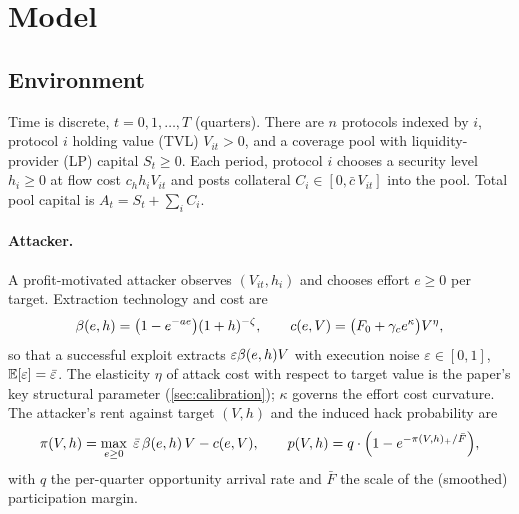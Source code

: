 \section{Model}\label{sec:model}


\subsection{Environment}\label{sec:env}

Time is discrete, $t = 0, 1, \ldots, T$ (quarters). There are $n$
protocols indexed by $i$, protocol $i$ holding value (TVL) $V_{it} > 0$,
and a coverage pool with liquidity-provider (LP) capital $S_t \geq 0$.
Each period, protocol $i$ chooses a security level $h_i \geq 0$ at flow
cost $c_h h_i V_{it}$ and posts collateral $C_i \in [0, \bar{c}\,V_{it}]$
into the pool. Total pool capital is $A_t = S_t + \sum_i C_i$.

\paragraph{Attacker.} A profit-motivated attacker observes
$(V_{it}, h_i)$ and chooses effort $e \geq 0$ per target. Extraction
technology and cost are
\begin{equation}\label{eq:attacker-tech}
  \beta(e, h) = \bigl(1 - e^{-a e}\bigr)(1 + h)^{-\zeta},
  \qquad
  c(e, V) = \bigl(F_0 + \gamma_c e^{\kappa}\bigr) V^{\eta},
\end{equation}
so that a successful exploit extracts $\varepsilon \beta(e,h) V$ with
execution noise $\varepsilon \in [0,1]$,
$\mathbb{E}[\varepsilon] = \bar\varepsilon$. The elasticity $\eta$ of attack cost
with respect to target value is the paper's key structural parameter
(\cref{sec:calibration}); $\kappa$ governs the effort cost curvature.
The attacker's rent against target $(V, h)$ and the induced hack
probability are
\begin{equation}\label{eq:rent}
  \pi(V, h) = \max_{e \geq 0}\;
    \bar\varepsilon\, \beta(e, h)\, V - c(e, V),
  \qquad
  p(V, h) = q \cdot \Bigl(1 - e^{-\pi(V,h)_+ / \bar{F}}\Bigr),
\end{equation}
with $q$ the per-quarter opportunity arrival rate and $\bar{F}$ the
scale of the (smoothed) participation margin. %

